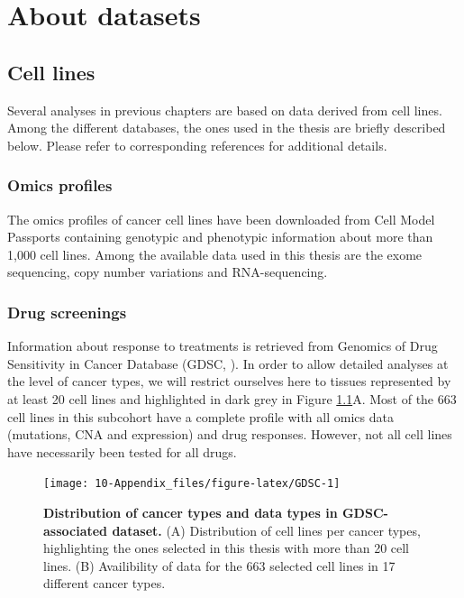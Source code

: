 \documentclass[a4paper,12pt,twoside,onecolumn,openright,final,oldfontcommands]{memoir}
\begin{document}
\appendix {}


\chapter{About datasets}\label{appendix-datasets}

\section{Cell lines}\label{appendix-cl}

Several analyses in previous chapters are based on data derived from
cell lines. Among the different databases, the ones used in the thesis
are briefly described below. Please refer to corresponding references
for additional details.

\subsection{Omics profiles}\label{omics-profiles}

The omics profiles of cancer cell lines have been downloaded from Cell
Model Passports \citep{van2019cell} containing genotypic and phenotypic
information about more than 1,000 cell lines. Among the available data
used in this thesis are the exome sequencing, copy number variations and
RNA-sequencing.

\subsection{Drug screenings}\label{appendix-GDSC}

Information about response to treatments is retrieved from Genomics of
Drug Sensitivity in Cancer Database (GDSC, \citet{yang2012genomics}). In
order to allow detailed analyses at the level of cancer types, we will
restrict ourselves here to tissues represented by at least 20 cell lines
and highlighted in dark grey in Figure \ref{fig:GDSC}A. Most of the 663
cell lines in this subcohort have a complete profile with all omics data
(mutations, CNA and expression) and drug responses. However, not all
cell lines have necessarily been tested for all drugs.

\begin{figure}

{\centering \texttt{[image: 10-Appendix\_files/figure-latex/GDSC-1]} 

}

\caption[Distribution of cancer types and data types in GDSC-associated dataset]{\textbf{Distribution of cancer types and data types
in GDSC-associated dataset.} (A) Distribution of cell lines per cancer
types, highlighting the ones selected in this thesis with more than 20
cell lines. (B) Availibility of data for the 663 selected cell lines in
17 different cancer types.}\label{fig:GDSC}
\end{figure}
\end{document}

